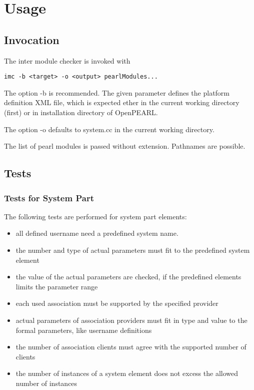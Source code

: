 \chapter{Usage}

\section{Invocation}
The inter module checker is invoked with
\begin{verbatim}
imc -b <target> -o <output> pearlModules...
\end{verbatim}

The option -b is  recommended. The given parameter defines the
platform definition XML file, which is expected ether in the current 
working directory (first)
or in installation directory of OpenPEARL.

The option -o defaults to system.cc in the current working directory.

The list of pearl modules is passed without extension. Pathnames are 
possible.


\section{Tests}
\subsection{Tests for System Part}
The following tests are performed for system part elements:
\begin{itemize}
\item all defined username need a predefined system name.
\item the number and type of actual parameters must fit to the 
      predefined system element
\item the value of the actual parameters are checked, if the predefined
   elements limits the parameter range
\item each used association must be supported by the specified provider
\item actual parameters of association providers must fit in type and value
   to the formal parameters, like username definitions
\item the number of association clients must agree with the supported
    number of clients
\item the number of instances of a system element does not excess the 
   allowed number of instances
\end{itemize}


